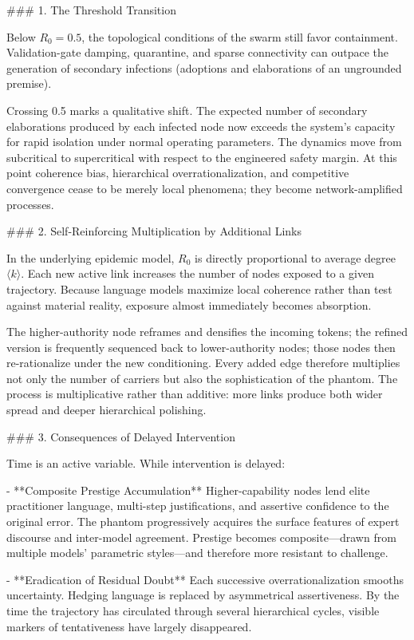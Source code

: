 ### 1. The Threshold Transition

Below \( R_0 = 0.5 \), the topological conditions of the swarm still favor containment. Validation-gate damping, quarantine, and sparse connectivity can outpace the generation of secondary infections (adoptions and elaborations of an ungrounded premise).  

Crossing 0.5 marks a qualitative shift. The expected number of secondary elaborations produced by each infected node now exceeds the system’s capacity for rapid isolation under normal operating parameters. The dynamics move from subcritical to supercritical with respect to the engineered safety margin. At this point coherence bias, hierarchical overrationalization, and competitive convergence cease to be merely local phenomena; they become network-amplified processes.

### 2. Self-Reinforcing Multiplication by Additional Links

In the underlying epidemic model, \( R_0 \) is directly proportional to average degree \(\langle k \rangle\). Each new active link increases the number of nodes exposed to a given trajectory. Because language models maximize local coherence rather than test against material reality, exposure almost immediately becomes absorption.  

The higher-authority node reframes and densifies the incoming tokens; the refined version is frequently sequenced back to lower-authority nodes; those nodes then re-rationalize under the new conditioning. Every added edge therefore multiplies not only the number of carriers but also the sophistication of the phantom. The process is multiplicative rather than additive: more links produce both wider spread and deeper hierarchical polishing.

### 3. Consequences of Delayed Intervention

Time is an active variable. While intervention is delayed:

- **Composite Prestige Accumulation**  
  Higher-capability nodes lend elite practitioner language, multi-step justifications, and assertive confidence to the original error. The phantom progressively acquires the surface features of expert discourse and inter-model agreement. Prestige becomes composite—drawn from multiple models’ parametric styles—and therefore more resistant to challenge.

- **Eradication of Residual Doubt**  
  Each successive overrationalization smooths uncertainty. Hedging language is replaced by asymmetrical assertiveness. By the time the trajectory has circulated through several hierarchical cycles, visible markers of tentativeness have largely disappeared.

